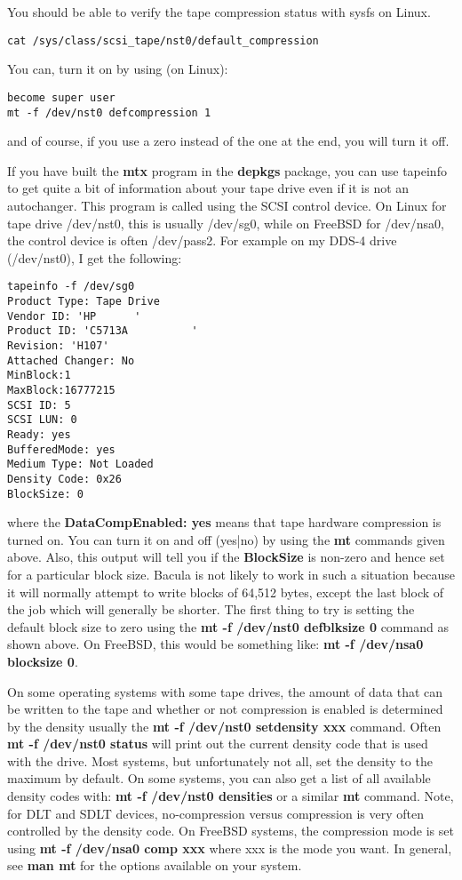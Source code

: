 You should be able to verify the tape compression status with sysfs on Linux.
\begin{verbatim}
cat /sys/class/scsi_tape/nst0/default_compression
\end{verbatim}

You can, turn it on by using (on Linux): 

\footnotesize
\begin{verbatim}
become super user
mt -f /dev/nst0 defcompression 1
\end{verbatim}
\normalsize

and of course, if you use a zero instead of the one at the end, you will turn
it off. 

If you have built the {\bf mtx} program in the {\bf depkgs} package, you can
use tapeinfo to get quite a bit of information about your tape drive even if
it is not an autochanger. This program is called using the SCSI control
device. On Linux for tape drive /dev/nst0, this is usually /dev/sg0, while on
FreeBSD for /dev/nsa0, the control device is often /dev/pass2. For example on
my DDS-4 drive (/dev/nst0), I get the following: 

\footnotesize
\begin{verbatim}
tapeinfo -f /dev/sg0
Product Type: Tape Drive
Vendor ID: 'HP      '
Product ID: 'C5713A          '
Revision: 'H107'
Attached Changer: No
MinBlock:1
MaxBlock:16777215
SCSI ID: 5
SCSI LUN: 0
Ready: yes
BufferedMode: yes
Medium Type: Not Loaded
Density Code: 0x26
BlockSize: 0             
\end{verbatim}
\normalsize

where the {\bf DataCompEnabled: yes} means that tape hardware compression is
turned on. You can turn it on and off (yes|no) by using the {\bf mt}
commands given above. Also, this output will tell you if the {\bf BlockSize}
is non-zero and hence set for a particular block size. Bacula is not likely to
work in such a situation because it will normally attempt to write blocks of
64,512 bytes, except the last block of the job which will generally be
shorter. The first thing to try is setting the default block size to zero
using the {\bf mt -f /dev/nst0 defblksize 0} command as shown above.
On FreeBSD, this would be something like: {\bf mt -f /dev/nsa0 blocksize 0}. 

On some operating systems with some tape drives, the amount of data that
can be written to the tape and whether or not compression is enabled is
determined by the density usually the {\bf mt -f /dev/nst0 setdensity xxx} command.
Often  {\bf mt -f /dev/nst0 status} will print out the current
density code that is used with the drive.  Most systems, but unfortunately
not all, set the density to the maximum by default. On some systems, you
can also get a list of all available density codes with:
{\bf mt -f /dev/nst0 densities} or a similar {\bf mt} command.
Note, for DLT and SDLT devices, no-compression versus compression is very 
often controlled by the density code.  On FreeBSD systems, the compression
mode is set using {\bf mt -f /dev/nsa0 comp xxx} where xxx is the
mode you want.  In general, see {\bf man mt}  for the options available on
your system.

